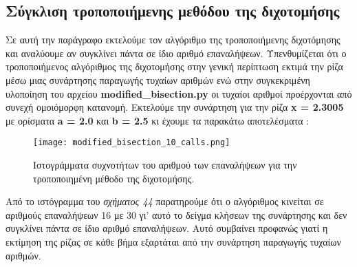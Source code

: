 \documentclass[First Project.tex]{subfiles}
\begin{document}
\subsection{ Σύγκλιση τροποποιήμενης μεθόδου της διχοτομήσης }

Σε αυτή την παράγραφο εκτελούμε τον αλγόριθμο της τροποποιήμενης διχοτόμησης και αναλύουμε αν συγκλίνει πάντα σε ίδιο αριθμό επαναλήψεων.
Υπενθυμίζεται ότι ο τροποποιήμενος αλγόριθμος της διχοτομήσης στην γενική περίπτωση εκτιμά την ρίζα μέσω μιας συνάρτησης παραγωγής τυχαίων
αριθμών ενώ στην συγκεκριμένη υλοποίηση του αρχείου \textlatin{\textbf{modified\_bisection.py}} οι τυχαίοι αριθμοί προέρχονται από συνεχή
ομοιόμορφη κατανομή. Εκτελούμε την συνάρτηση για την ρίζα \textbf{\textlatin{x = 2.3005}} με ορίσματα \textlatin{\textbf{a = 2.0}} και
\textlatin{\textbf{b = 2.5}} κι έχουμε τα παρακάτω αποτελέσματα : 
\begin{figure}[h!]
    \centering
    \captionsetup{justification=centering}
    \begin{center}
        \texttt{[image: modified\_bisection\_10\_calls.png]}    
        \caption{ Ιστογράμματα συχνοτήτων του αριθμού των επαναλήψεων για την τροποποιημένη μέθοδο της διχοτομήσης. }
    \end{center}
\end{figure}

Από το ιστόγραμμα του \textit{σχήματος 44} παρατηρούμε ότι ο αλγόριθμος κινείται σε αριθμούς επαναλήψεων 16 με 30 γι' αυτό το δείγμα κλήσεων της
συνάρτησης και δεν συγκλίνει πάντα σε ίδιο αριθμό επαναλήψεων. Αυτό συμβαίνει προφανώς γιατί η εκτίμηση της ρίζας σε κάθε βήμα εξαρτάται από 
την συνάρτηση παραγωγής τυχαίων αριθμών. 
\end{document}
